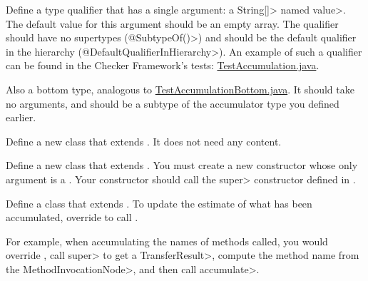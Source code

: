Define a type qualifier that has a single argument: a \<String[]> named \<value>.
The default value for this argument should be an empty array. The
qualifier should have no supertypes (\<@SubtypeOf({})>) and should
be the default qualifier in the hierarchy (\<@DefaultQualifierInHierarchy>).
An example of such a qualifier can be found in the Checker Framework's tests:
\href{https://github.com/typetools/checker-framework/blob/master/framework/src/test/java/testaccumulation/qual/TestAccumulation.java}{TestAccumulation.java}.

Also a bottom type, analogous to
\href{https://github.com/typetools/checker-framework/blob/master/framework/src/test/java/testaccumulation/qual/TestAccumulationBottom.java}{TestAccumulationBottom.java}.
It should take no arguments, and should be a subtype of the accumulator type you defined earlier.


Define a new class that extends .
It does not need any content.

Define a new class that extends .
You must create a new constructor whose only argument is a .
Your constructor should call the \<super> constructor defined in
.



Define a class that extends .
To update the estimate of what has been accumulated, override
 to call
.

For example, when accumulating the names of methods called, you would override
,
call \<super> to get a \<TransferResult>, compute the method name from the \<MethodInvocationNode>,
and then call \<accumulate>.
